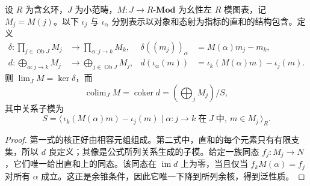 \begin{proposition}[模的极限与余极限公式]\label{b4:prop:module-limit-formulas}
	设 \(R\) 为含幺环，\(J\) 为小范畴，\(M:J\rightarrow R\text{-}\mathbf{Mod}\) 为幺性左 \(R\) 模图表，记 \(M_j=M(j)\)。以下 \(\iota_j\) 与 \(\iota_\alpha\) 分别表示以对象和态射为指标的直和的结构包含。定义
	\[
		\begin{aligned}
			\delta:\prod_{j\in\operatorname{Ob}J}M_j &\longrightarrow\prod_{\alpha:j\rightarrow k}M_k, & \delta((m_j))_\alpha&=M(\alpha)m_j-m_k,\\
			d:\bigoplus_{\alpha:j\rightarrow k}M_j &\longrightarrow\bigoplus_{j\in\operatorname{Ob}J}M_j, & d(\iota_\alpha(m))&=\iota_k(M(\alpha)m)-\iota_j(m).
		\end{aligned}
	\]
	则 \(\lim_JM=\ker\delta\)，而
	\[
		\operatorname{colim}_JM =\operatorname{coker}d =\left(\bigoplus_jM_j\right)/S,
	\]
	其中关系子模为
	\[
		S=\bigl\langle\,\iota_k(M(\alpha)m)-\iota_j(m)\mid \alpha:j\rightarrow k\;\text{在}\;J\;\text{中},\ m\in M_j\,\bigr\rangle_R.
	\]
\end{proposition}
\begin{proof}
	第一式的核正好由相容元组组成。第二式中，直和的每个元素只有有限支集，所以 \(d\) 良定义；其像是公式所列关系生成的子模。给定一族同态 \(f_j:M_j\rightarrow N\)，它们唯一给出直和上的同态。该同态在 \(\operatorname{im}d\) 上为零，当且仅当 \(f_kM(\alpha)=f_j\) 对所有 \(\alpha\) 成立。这正是余锥条件，因此它唯一下降到所列余核，得到泛性质。
\end{proof}

